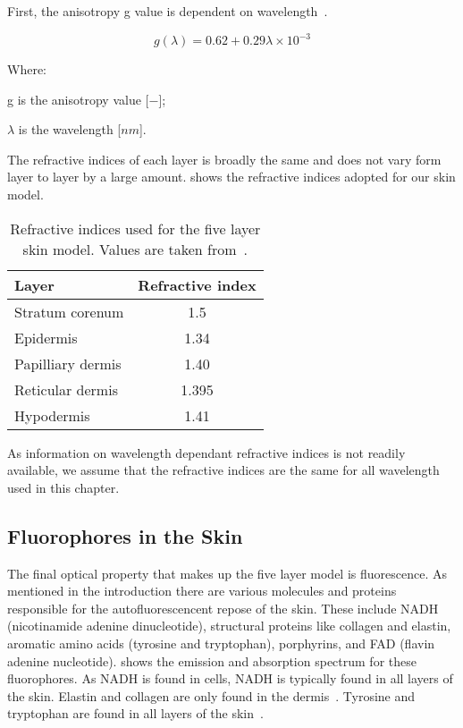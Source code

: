 First, the anisotropy g value is dependent on wavelength~\cite{louisethesis,van1989skin}.

\begin{equation}
g(\lambda)=0.62+0.29\lambda\times10^{-3}
\end{equation}

\noindent Where:

\indent g is the anisotropy value [$-$];

\indent $\lambda$ is the wavelength [$nm$].

The refractive indices of each layer is broadly the same and does not vary form layer to layer by a large amount.
 shows the refractive indices adopted for our skin model.

\begin{table}[!htpb]
  \centering

  \begin{tabular}{l|c}
  \hline

  \hline
  Layer & Refractive index \\
  \hline
    Stratum corenum & 1.5 \\
    Epidermis &  1.34\\
    Papilliary dermis & 1.40 \\
    Reticular dermis &  1.395\\
    Hypodermis &  1.41\\

  \hline
  \end{tabular}
    \caption{Refractive indices used for the five layer skin model. Values are taken from~\cite{meglinski2002quantitative}.}
  \label{tab:refindex}
\end{table}

As information on wavelength dependant refractive indices is not readily available, we assume that the refractive indices are the same for all wavelength used in this chapter.

\subsection*{Fluorophores in the Skin}

The final optical property that makes up the five layer model is fluorescence.
As mentioned in the introduction there are various molecules and proteins responsible for the autofluorescencent repose of the skin.
These include NADH (nicotinamide adenine dinucleotide), structural proteins like collagen and elastin, aromatic amino acids (tyrosine and tryptophan), porphyrins, and FAD (flavin adenine nucleotide).
 shows the emission and absorption spectrum for these fluorophores.
As NADH is found in cells, NADH is typically found in all layers of the skin.
Elastin and collagen are only found in the dermis~\cite{gillies2000fluorescence}.
Tyrosine and tryptophan are found in all layers of the skin~\cite{gillies2000fluorescence}.

